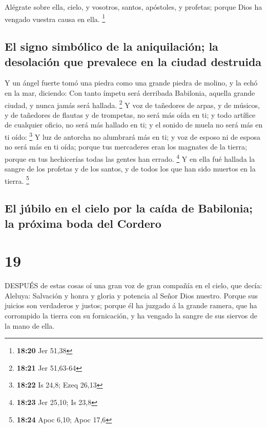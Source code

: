 Alégrate sobre ella, cielo, y vosotros, santos, apóstoles,
y profetas; porque Dios ha vengado vuestra causa en ella. \footnote{\textbf{18:20}
  Jer 51,38}

\hypertarget{el-signo-simbuxf3lico-de-la-aniquilaciuxf3n-la-desolaciuxf3n-que-prevalece-en-la-ciudad-destruida}{%
\subsection{El signo simbólico de la aniquilación; la desolación que
prevalece en la ciudad
destruida}\label{el-signo-simbuxf3lico-de-la-aniquilaciuxf3n-la-desolaciuxf3n-que-prevalece-en-la-ciudad-destruida}}

 Y un ángel fuerte tomó una piedra como una grande piedra
de molino, y la echó en la mar, diciendo: Con tanto ímpetu será
derribada Babilonia, aquella grande ciudad, y nunca jamás será hallada.
\footnote{\textbf{18:21} Jer 51,63-64}  Y voz de tañedores
de arpas, y de músicos, y de tañedores de flautas y de trompetas, no
será más oída en ti; y todo artífice de cualquier oficio, no será más
hallado en ti; y el sonido de muela no será más en ti oído: \footnote{\textbf{18:22}
  Is 24,8; Ezeq 26,13}  Y luz de antorcha no alumbrará más
en ti; y voz de esposo ni de esposa no será más en ti oída; porque tus
mercaderes eran los magnates de la tierra; porque en tus hechicerías
todas las gentes han errado. \footnote{\textbf{18:23} Jer 25,10; Is 23,8}
 Y en ella fué hallada la sangre de los profetas y de los
santos, y de todos los que han sido muertos en la tierra. \footnote{\textbf{18:24}
  Apoc 6,10; Apoc 17,6}

\hypertarget{el-juxfabilo-en-el-cielo-por-la-cauxedda-de-babilonia-la-pruxf3xima-boda-del-cordero}{%
\subsection{El júbilo en el cielo por la caída de Babilonia; la próxima
boda del
Cordero}\label{el-juxfabilo-en-el-cielo-por-la-cauxedda-de-babilonia-la-pruxf3xima-boda-del-cordero}}

\hypertarget{section-18}{%
\section{19}\label{section-18}}

 DESPUÉS de estas cosas oí una gran voz de gran compañía en
el cielo, que decía: Aleluya: Salvación y honra y gloria y potencia al
Señor Dios nuestro.  Porque sus juicios son verdaderos y
justos; porque él ha juzgado á la grande ramera, que ha corrompido la
tierra con su fornicación, y ha vengado la sangre de sus siervos de la
mano de ella.

